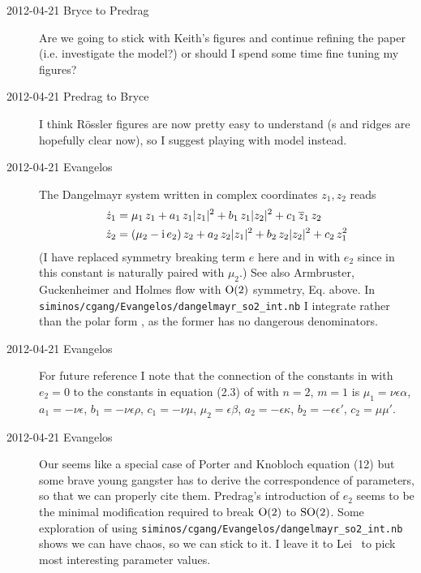 \begin{description}
\item[2012-04-21 Bryce to Predrag] Are we going to stick
with Keith's figures and continue refining the paper (i.e. investigate
the {\twoMode} model?) or should I spend some time fine tuning my figures?

\item[2012-04-21 Predrag to Bryce] I think R\"ossler figures are now
pretty easy to understand (\poincBord s and ridges are hopefully clear
now), so I suggest playing with {\twoMode} model instead.

\item[2012-04-21 Evangelos] The Dangelmayr system written in complex
coordinates $z_1,z_2$ reads
\begin{subequations}\label{eq:DangSO2}
\begin{align}
  \dot{z}_1 &= \mu_1\,z_1+a_1\,z_1|z_1|^2+b_1\,z_1|z_2|^2+c_1\,\overline{z}_1\,z_2\,\\
  \dot{z}_2 &= (\mu_2-\mathrm{i}\, e_2)\,z_2+a_2\,z_2|z_1|^2+b_2\,z_2|z_2|^2+c_2\,z_1^2
\end{align}
\end{subequations}
(I have replaced symmetry breaking term $e$ here and in 
with $e_2$ since in this constant is naturally paired with $\mu_2$.)
See also Armbruster, Guckenheimer and Holmes flow with
$\textrm{O}(2)$ symmetry, Eq.  above.
In \texttt{siminos/cgang/Evangelos/dangelmayr\_so2\_int.nb}
I integrate  rather than the polar form ,
as the former has no dangerous denominators.

\item[2012-04-21 Evangelos] For future reference I note that the connection
of the constants in  with $e_2=0$ to the constants in
equation (2.3) of  with $n=2$, $m=1$ is $\mu_1=\nu\epsilon\alpha$,
$a_1=-\nu\epsilon$, $b_1=-\nu\epsilon\rho$, $c_1=-\nu\mu$, $\mu_2=\epsilon\beta$,
$a_2=-\epsilon\kappa$, $b_2=-\epsilon\epsilon'$, $c_2=\mu\mu'$.

\item[2012-04-21 Evangelos] Our  seems like a special case of
Porter and Knobloch equation (12) but some brave young gangster
has to derive the correspondence of parameters, so that we can properly cite
them. Predrag's introduction of $e_2$
seems to be the minimal modification required to break $\textrm{O}(2)$ to $\textrm{SO}(2)$.
Some exploration of 
using \texttt{siminos/cgang/Evangelos/dangelmayr\_so2\_int.nb}
shows we can have chaos, so we can stick to it. I leave it to Lei \etal\
to pick most interesting parameter values.


\end{description}
